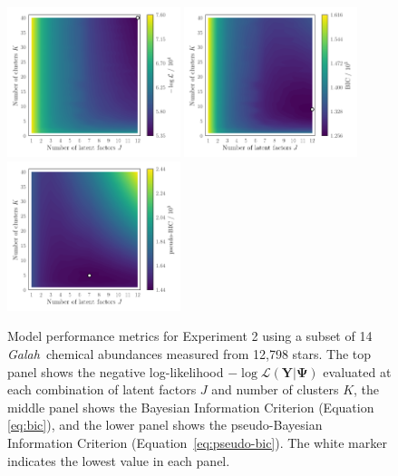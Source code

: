 \documentclass[twocolumn]{aastex61}
\newcommand{\project}[1]{\textsl{#1}}
\newcommand{\Galah}{\project{Galah}}
\newcommand{\vect}[1]{\boldsymbol{\mathbf{#1}}}
\renewcommand{\vec}[1]{\vect{#1}}
\newcommand{\data}{\textbf{Y}}
\begin{document}
\begin{figure}
	\includegraphics[width=0.45\textwidth]{experiments/galah-experiment-2-gridsearch-ll-contours.png}
	\includegraphics[width=0.45\textwidth]{experiments/galah-experiment-2-gridsearch-bic-contours.png}
	\includegraphics[width=0.45\textwidth]{experiments/galah-experiment-2-gridsearch-pseudobic-contours.png}
    \caption{Model performance metrics for Experiment 2 using a subset of 14 
    		 \Galah\ chemical abundances measured from 12,798 stars. The top 
		 	 panel shows the negative log-likelihood 
			 $-\log{\mathcal{L}\left(\data|\vec\Psi\right)}$ 
			 evaluated at each combination of latent factors $J$ and number 
			 of clusters $K$, the middle panel shows the Bayesian Information
			 Criterion (Equation \ref{eq:bic}), and the lower panel shows
			 the pseudo-Bayesian Information Criterion 
			 (Equation~\ref{eq:pseudo-bic}). The white marker indicates the 
			 lowest value in each panel.}
    \label{fig:experiment-2-gridsearch}
\end{figure}
\end{document}
